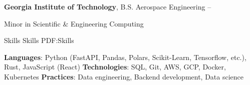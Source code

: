 \documentclass[letterpaper,MMMyyyy,nonstopmode]{simpleresumecv}
\begin{document}
\begin{Body}
\BigGap
\Entry
\textbf{Georgia Institute of Technology},
B.S. Aerospace Engineering
\hfill
{} -- 

\Gap
\begin{Detail}
\BulletItem
Minor in Scientific \& Engineering Computing
\end{Detail}

\Section
{Skills}
{Skills}
{PDF:Skills}

\Entry
\textbf{Languages}: Python (FastAPI, Pandas, Polars, Scikit-Learn, Tensorflow, etc.), Rust, JavaScript (React)
\Entry
\textbf{Technologies}: SQL, Git, AWS, GCP, Docker, Kubernetes
\Entry
\textbf{Practices}: Data engineering, Backend development, Data science

%
%


\end{Body}
\end{document}

